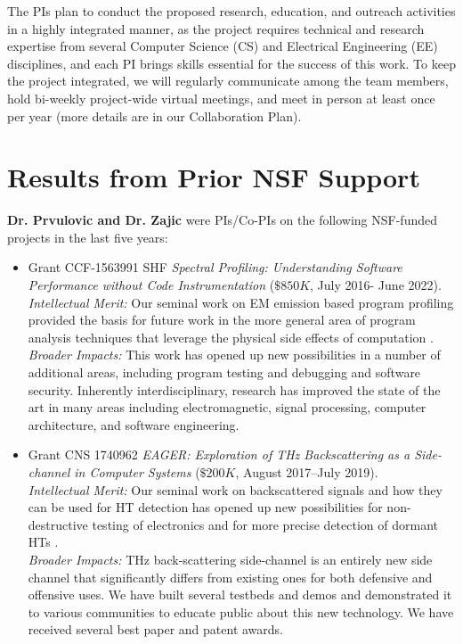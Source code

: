 \documentclass[11 pt]{article}
\begin{document}
The PIs plan to conduct the proposed research, education, and outreach activities in a highly integrated manner, as the project requires technical and research expertise from several Computer Science (CS) and Electrical Engineering (EE) disciplines, and each PI brings skills essential for the success of this work. To keep the project integrated, we will regularly communicate among the team members, hold bi-weekly project-wide virtual meetings, and meet in person at least once per year (more details are in our Collaboration Plan).


\section{Results from Prior NSF Support}
\label{sec:prior}
\noindent
{\bf Dr. Prvulovic and Dr. Zajic} were PIs/Co-PIs on the following NSF-funded projects in the last five years:

\begin{itemize}[topsep=0pt,itemsep=0pt]
\item Grant CCF-1563991 SHF \textit{Spectral Profiling: Understanding Software Performance without Code Instrumentation}
($\$850K$, July 2016- June 2022). \\
\textit{Intellectual Merit:}
Our seminal work on EM emission based program profiling provided the basis for future work in the more general area of program analysis techniques that leverage the physical side
effects of computation \cite{Zop, Zop2, Nader2016, Elvan2021}. \\
\textit{Broader Impacts:}
This work has opened up new possibilities in a number of additional areas,
including program testing and debugging and software security. Inherently interdisciplinary, research has improved the state of the art in many areas including electromagnetic, signal processing, computer architecture, and software engineering.

\item Grant CNS 1740962 \textit{EAGER: Exploration of THz Backscattering
as a Side-channel in Computer Systems}
($\$200K$, August 2017--July 2019). \\
\textit{Intellectual Merit:}
Our seminal work on backscattered signals and how they can be used for HT detection has opened up new possibilities
for non-destructive testing of electronics and for more precise detection of dormant HTs \cite{Pavel2020,nguyen19,Erik2022}.\\
\textit{Broader Impacts:}
THz back-scattering side-channel is an entirely new side channel that significantly differs
from existing ones for both defensive and offensive uses. We have built several testbeds and demos and demonstrated it to various communities
to educate public about this new technology. We have received several best paper and patent awards.
\end{itemize}
\end{document}
